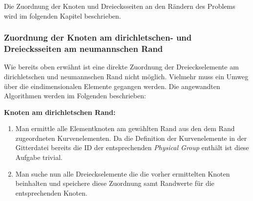 Die Zuordnung der Knoten und Dreiecksseiten an den Rändern des Problems wird im folgenden Kapitel beschrieben.

\subsubsection{Zuordnung der Knoten am dirichletschen- und Dreiecksseiten am neumannschen Rand}
Wie bereits oben erwähnt ist eine direkte Zuordnung der Dreieckselemente am dirichletschen und neumannschen Rand nicht möglich. Vielmehr muss ein Umweg über die eindimensionalen Elemente gegangen werden. Die angewandten Algorithmen werden im Folgenden beschrieben: \newline

\textbf{Knoten am dirichletschen Rand:}
\begin{enumerate}
	\item Man ermittle alle Elementknoten am gewählten Rand aus den dem Rand zugeordneten Kurvenelementen. Da die Definition der Kurvenelemente in der Gitterdatei bereits die ID der entsprechenden \textit{Physical Group} enthält ist diese Aufgabe trivial.
	\item Man suche nun alle Dreieckselemente die die vorher ermittelten Knoten beinhalten und speichere diese Zuordnung samt Randwerte für die entsprechenden Knoten.
\end{enumerate}

